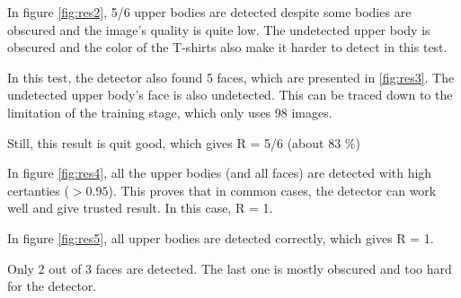 In figure \ref{fig:res2}, 5/6 upper bodies are detected despite some bodies are obscured and the image's quality is quite low. The undetected upper body is obscured and the color of the T-shirts also make it harder to detect in this test.

%	

In this test, the detector also found 5 faces, which are presented in \ref{fig:res3}. The undetected upper body's face is also undetected. This can be traced down to the limitation of the training stage, which only uses 98 images.

Still, this result is quit good, which gives R = 5/6 (about 83 \%)

In figure \ref{fig:res4}, all the upper bodies (and all faces) are detected with high certanties (\(> 0.95\)). This proves that in common cases, the detector can work well and give trusted result.
In this case, R = 1.

In figure \ref{fig:res5}, all upper bodies are detected correctly, which gives R = 1.

Only 2 out of 3 faces are detected. The last one is mostly obscured and too hard for the detector. \\
